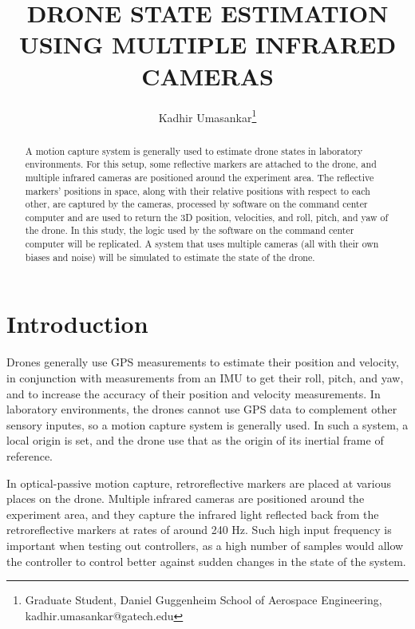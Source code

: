\documentclass[letterpaper, preprint, paper,11pt]{AAS}	%
\begin{document}
\title{DRONE STATE ESTIMATION USING MULTIPLE INFRARED CAMERAS}

\author{Kadhir Umasankar\thanks{Graduate Student, Daniel Guggenheim School of Aerospace Engineering, kadhir.umasankar@gatech.edu}}


\maketitle{} 		


\begin{abstract}
A motion capture system is generally used to estimate drone states in laboratory environments. For this setup, some reflective markers are attached to the drone, and multiple infrared cameras are positioned around the experiment area. The reflective markers' positions in space, along with their relative positions with respect to each other, are captured by the cameras, processed by software on the command center computer and are used to return the 3D position, velocities, and roll, pitch, and yaw of the drone. In this study, the logic used by the software on the command center computer will be replicated. A system that uses multiple cameras (all with their own biases and noise) will be simulated to estimate the state of the drone.
\end{abstract}


\section{Introduction}
Drones generally use GPS measurements to estimate their position and velocity, in conjunction with measurements from an IMU to get their roll, pitch, and yaw, and to increase the accuracy of their position and velocity measurements. In laboratory environments, the drones cannot use GPS data to complement other sensory inputes, so a motion capture system is generally used\cite{vicon_2022}. In such a system, a local origin is set, and the drone use that as the origin of its inertial frame of reference.

In optical-passive motion capture, retroreflective markers are placed at various places on the drone. Multiple infrared cameras are positioned around the experiment area, and they capture the infrared light reflected back from the retroreflective markers at rates of around 240 Hz. Such high input frequency is important when testing out controllers, as a high number of samples would allow the controller to control better against sudden changes in the state of the system.
\end{document}
